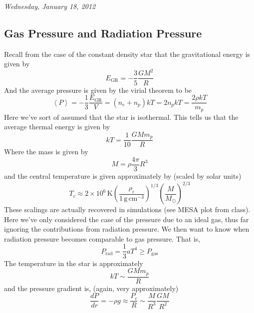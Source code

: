 \documentclass[10pt]{article}
\numberwithin{equation}{section}
\newcommand{\n}{\noindent}
\newcommand{\avg}[1]{\left\langle#1\right\rangle}
\begin{document}
\n\textit{Wednesday, January 18, 2012}
	\subsection{Gas Pressure and Radiation Pressure}
		Recall from the case of the constant density star that the gravitational energy is given by
		\begin{equation}
			\label{GPRP.1} E_{\mathrm{GR}}=-\frac{3}{5}\frac{GM^2}{R}
		\end{equation}
		And the average pressure is given by the virial theorem to be
		\begin{equation}
			\label{GPRP.2} \avg{P}=-\frac{1}{3}\frac{E_{\mathrm{GR}}}{V}=(n_e+n_p)kT=2n_pkT=\frac{2\rho kT}{m_p}
		\end{equation}
		Here we've sort of assumed that the star is
                isothermal. This tells us that the average thermal
                energy is given by
		\begin{equation}
			\label{GPRP.3} kT=\frac{1}{10}\frac{GMm_p}{R}
		\end{equation}
		Where the mass is given by
		\begin{equation}
			\label{GPRP.4} M=\rho\frac{4\pi}{3}R^3
		\end{equation}
		and the central temperature is given approximately by (scaled by solar units)
		\begin{equation}
			\label{GPRP.5} T_c\approx2\times 10^6\,\mathrm{K}\left(\frac{\rho_c}{1\,\mathrm{g\,cm^{-3}}}\right)^{1/3}\left(\frac{M}{M_\odot}\right)^{2/3}
		\end{equation}
		These scalings are actually recovered in simulations
                (see MESA plot from class). Here we've only considered
                the case of the pressure due to an ideal gas, thus far
                ignoring the contributions from radiation pressure. We
                then want to know when radiation pressure becomes
                comparable to gas pressure. That is,
		\begin{equation}
			\label{GPRP.6} P_{\mathrm{rad}}=\frac{1}{3} aT^4\geq P_{\mathrm{gas}}
		\end{equation}
		The temperature in the star is approximately
		\begin{equation}
			\label{GPRP.7} kT\sim\frac{GMm_p}{R}
		\end{equation}
		and the pressure gradient is, (again, very approximately)
		\begin{equation}
			\label{GPRP.8} \frac{dP}{dr}=-\rho g\approx \frac{P_c}{R}\sim\frac{M}{R^3}\frac{GM}{R^2}
		\end{equation}
\end{document}
